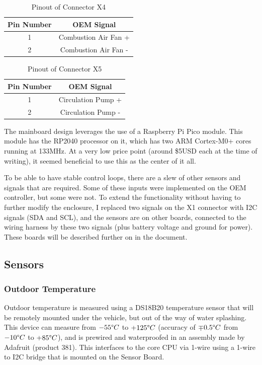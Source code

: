 \documentclass[lettersize,journal]{IEEEtran}
\begin{document}
\begin{table}
\begin{center}
\caption{Pinout of Connector X4}
\label{pinout-x4}
\begin{tabular}{| c | c |}
\hline
Pin Number & OEM Signal \\
\hline
1 & Combustion Air Fan + \\
\hline
2 & Combustion Air Fan - \\
\hline
\end{tabular}
\end{center}
\end{table}

\begin{table}
\begin{center}
\caption{Pinout of Connector X5}
\label{pinout-x5}
\begin{tabular}{| c | c |}
\hline
Pin Number & OEM Signal \\
\hline
1 & Circulation Pump + \\
\hline
2 & Circulation Pump - \\
\hline
\end{tabular}
\end{center}
\end{table}

The mainboard design leverages the use of a Raspberry Pi Pico module.  This module has the RP2040 processor on it, which has two ARM Cortex-M0+ cores running at 133MHz.  At a very low price point (around \$5USD each at the time of writing), it seemed beneficial to use this as the center of it all.

To be able to have stable control loops, there are a slew of other sensors and signals that are required.  Some of these inputs were implemented on the OEM controller, but some were not.  To extend the functionality without having to further modify the enclosure, I replaced two signals on the X1 connector with I2C signals (SDA and SCL), and the sensors are on other boards, connected to the wiring harness by these two signals (plus battery voltage and ground for power).  These boards will be described further on in the document.

\subsection{Sensors}
\subsubsection{Outdoor Temperature}
Outdoor temperature is measured using a DS18B20 temperature sensor that will be remotely mounted under the vehicle, but out of the way of water splashing.  This device can measure from $-55 \degree C$ to $+125 \degree C$ (accuracy of $\mp 0.5 \degree C$ from $-10 \degree C$ to $+85 \degree C$), and is prewired and waterproofed in an assembly made by Adafruit (product 381).  This interfaces to the core CPU via 1-wire using a 1-wire to I2C bridge that is mounted on the Sensor Board.
\end{document}
